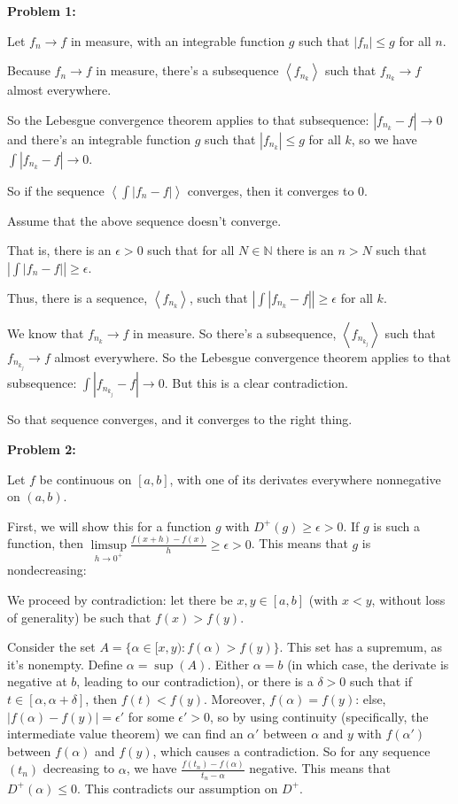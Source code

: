 \documentclass[a4paper,12pt]{article}
\newcommand{\tab}{\hspace{4mm}} %
\newcommand{\shunt}{\vspace{20mm}}
\newcommand{\absval}[1]{\left\lvert #1 \right\rvert}
\newcommand{\anbrack}[1]{\left\langle #1 \right\rangle}
\newcommand{\al}{\alpha} %
\newcommand{\de}{\delta}
\newcommand{\ep}{\epsilon}
\newcommand{\N}{\mathbb{N}}
\begin{document}
{\bf Problem 1:} 

Let $f_n \to f$ in measure, with an integrable function $g$ such that $\absval{f_n} \leq g$ for all $n$.

Because $f_n \to f$ in measure, there's a subsequence $\anbrack{f_{n_k}}$ such that $f_{n_k} \to f$ almost everywhere.

So the Lebesgue convergence theorem applies to that subsequence: $\absval{f_{n_k} - f} \to 0$ and there's an integrable function $g$ such that $\absval{f_{n_k}} \leq g$ for all $k$, so we have $\int \absval{f_{n_k} - f} \to 0$.

So if the sequence $\anbrack{\int \absval{f_n - f}}$ converges, then it converges to $0$.

Assume that the above sequence doesn't converge.

\tab That is, there is an $\ep>0$ such that for all $N \in \N$ there is an $n > N$ such that $\absval{\int \absval{f_n-f}} \geq \ep$.

\tab Thus, there is a sequence, $\anbrack{f_{n_k}}$, such that $\absval{\int \absval{f_{n_k}-f}} \geq \ep$ for all $k$.

\tab We know that $f_{n_k} \to f$ in measure. So there's a subsequence, $\anbrack{f_{n_{k_j}}}$ such that $f_{n_{k_j}} \to f$ almost everywhere. So the Lebesgue convergence theorem applies to that subsequence: $\int \absval{f_{n_{k_j}} - f} \to 0$. But this is a clear contradiction. 

So that sequence converges, and it converges to the right thing.

\shunt

{\bf Problem 2:}

Let $f$ be continuous on $[a,b]$, with one of its derivates everywhere nonnegative on $(a,b)$.

First, we will show this for a function $g$ with $D^+(g) \geq \ep >0$. If $g$ is such a function, then $\limsup\limits_{h \to 0^+} \frac{f(x+h)-f(x)}{h} \geq \ep> 0$. This means that $g$ is nondecreasing:

\tab We proceed by contradiction: let there be $x,y \in [a,b]$ (with $x<y$, without loss of generality) be such that $f(x) > f(y)$.

\tab Consider the set $A = \{\al \in [x,y): f(\al) > f(y)\}$. This set has a supremum, as it's nonempty. Define $\al =\sup(A)$. Either $\al = b$ (in which case, the derivate is negative at $b$, leading to our contradiction), or there is a $\de>0$ such that if $t \in [\al, \al+\de]$, then $f(t) < f(y)$. Moreover, $f(\al) = f(y)$: else, $\absval{f(\al) - f(y)} = \ep'$ for some $\ep' >0$, so by using continuity (specifically, the intermediate value theorem) we can find an $\al'$ between $\al$ and $y$ with $f(\al')$ between $f(\al)$ and $f(y)$, which causes a contradiction. So for any sequence $(t_n)$ decreasing to $\al$, we have $\frac{f(t_n) - f(\al)}{t_n - \al}$ negative. This means that $D^+(\al) \leq 0$. This contradicts our assumption on $D^+$.
\end{document}
